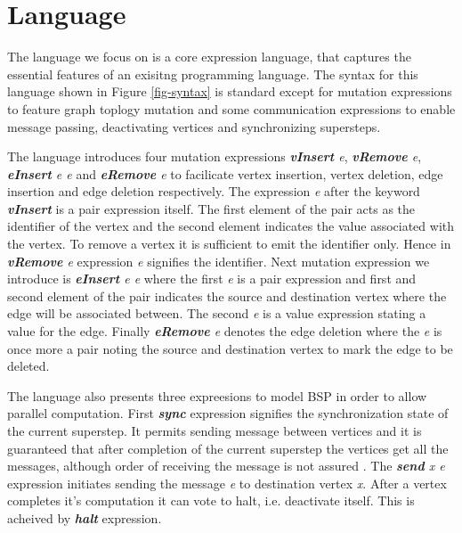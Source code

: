 \section{Language}
\label{sec:syntax}


The language we focus on is a core expression language, that captures the essential features of an exisitng programming language. The syntax for this language shown in Figure \ref{fig-syntax} is standard except for mutation expressions to feature graph toplogy mutation and some communication expressions to enable message passing, deactivating vertices and synchronizing supersteps.


The language introduces four mutation expressions \emph{\textbf{vInsert} e}, \emph{\textbf{vRemove} e}, \emph{\textbf{eInsert} e e} and \emph{\textbf{eRemove} e} to facilicate vertex insertion, vertex deletion, edge insertion and edge deletion respectively. The expression \emph{e} after the keyword \emph{\textbf{vInsert}} is a pair expression itself. The first element of the pair acts as the identifier of the vertex and the second element indicates the value associated with the vertex. To remove a vertex it is sufficient to emit the identifier only. Hence in \emph{\textbf{vRemove} e} expression \emph{e} signifies the identifier. Next mutation expression we introduce is \emph{\textbf{eInsert} e e} where the first \emph{e} is a pair expression and first and second element of the pair indicates the source and destination vertex where the edge will be associated between. The second \emph{e} is a value expression stating a value for the edge. Finally \emph{\textbf{eRemove} e} denotes the edge deletion where the \emph{e} is once more a pair noting the source and destination vertex to mark the edge to be deleted.


The language also presents three expreesions to model BSP in order to allow parallel computation. First \emph{\textbf{sync}} expression signifies the synchronization state of the current superstep. It permits sending message between vertices and it is guaranteed that after completion of the current superstep the vertices get all the messages, although order of receiving the message is not assured \cite{Pregel2010}. The \emph{\textbf{send} x e} expression initiates sending the message \emph{e} to destination vertex \emph{x}. After a vertex completes it's computation it can vote to halt, i.e. deactivate itself. This is acheived by \emph{\textbf{halt}} expression.


